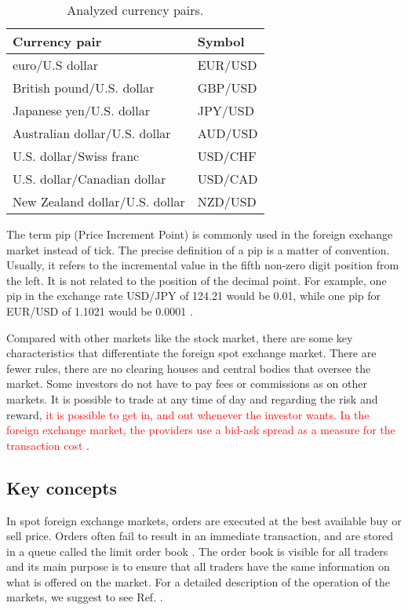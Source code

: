 \begin{table}[htbp]
\centering
\begin{threeparttable}
\caption{Analyzed currency pairs.}
\begin{tabular*}{\columnwidth}{P{5cm}P{3cm}}
\toprule
\bf{Currency pair} & \bf{Symbol} \tabularnewline
\midrule
euro/U.S dollar& EUR/USD \tabularnewline
British pound/U.S. dollar& GBP/USD \tabularnewline
Japanese yen/U.S. dollar& JPY/USD \tabularnewline
Australian dollar/U.S. dollar& AUD/USD \tabularnewline
U.S. dollar/Swiss franc& USD/CHF \tabularnewline
U.S. dollar/Canadian dollar& USD/CAD \tabularnewline
New Zealand dollar/U.S. dollar& NZD/USD \tabularnewline
\bottomrule
\end{tabular*}
\label{tab:majors}
\end{threeparttable}
\end{table}

The term pip (Price Increment Point) is commonly used in the foreign exchange
market instead of tick. The precise definition of a pip is a matter of
convention. Usually, it refers to the incremental value in the fifth non-zero
digit position from the left. It is not related to the position of the decimal
point. For example, one pip in the exchange rate USD/JPY of 124.21 would be
0.01, while one pip for EUR/USD of 1.1021 would be 0.0001
\cite{forex_structure,micro_eff,forex_market_micro,book_forex_3,order_flow_forex}.

Compared with other markets like the stock market, there are some key
characteristics that differentiate the foreign spot exchange market.
There are fewer rules, there are no clearing houses and central
bodies that oversee the market. Some investors do not have to pay fees or
commissions as on other markets. It is possible to trade at any time of day and
regarding the risk and reward, \textcolor{red}{it is possible to get in, and out whenever the
investor wants. In the foreign exchange market, the providers use a bid-ask
spread as a measure for the transaction cost \cite{book_forex_2}}.

\subsection{Key concepts}\label{subsec:key_concepts}

In spot foreign exchange markets, orders are executed at the best available buy
or sell price. Orders often fail to result in an immediate transaction, and are
stored in a queue called the limit order book
\cite{forex_structure,forex_market_micro,stat_prop,predictive_pow,intro_market_micro,prop_order_book}.
The order book is visible for all traders and its main purpose is to ensure
that all traders have the same information on what is offered on the market.
For a detailed description of the operation of the markets, we suggest to see
Ref. \cite{my_paper_response_financial}.

